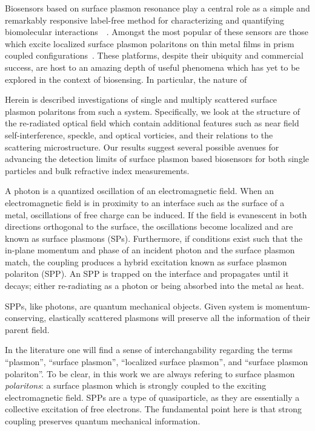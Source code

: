 Biosensors based on surface plasmon resonance play a central role as a
simple and remarkably responsive label-free method for characterizing and
quantifying biomolecular
interactions~\cite{homola1999surface}~\cite{homola2006surface}.  Amongst
the most popular of these sensors are those which excite localized surface
plasmon polaritons on thin metal films in prism coupled
configurations~\cite{hoa2007towards}.  These platforms, despite their
ubiquity and commercial success, are host to an amazing depth of useful
phenomena which has yet to be explored in the context of biosensing.  In
particular, the nature of 
\the\textwidth

Herein is described investigations of single and multiply scattered surface
plasmon polaritons from such a system.  Specifically, we look at the
structure of the re-radiated optical field which contain additional
features such as near field self-interference, speckle, and optical
vorticies, and their relations to the scattering microstructure.  Our
results suggest several possible avenues for advancing the detection limits
of surface plasmon based biosensors for both single particles and bulk
refractive index measurements.

A photon is a quantized oscillation of an electromagnetic field.  When an
electromagnetic  field is in proximity to an interface such as the surface
of a metal, oscillations of free charge can be induced.  If the field is
evanescent in both directions orthogonal to the surface, the oscillations
become localized and are known as surface plasmons (SPs).  Furthermore, if
conditions exist such that the in-plane momentum and phase of an incident
photon and the surface plasmon match, the coupling produces a hybrid
excitation known as surface plasmon polariton (SPP).  An SPP is trapped on
the interface and propagates until it decays; either re-radiating as a
photon or being absorbed into the metal as heat.

SPPs, like photons, are quantum mechanical objects.  Given system is
momentum-conserving, elastically scattered plasmons will preserve all the
information of their parent field.  

In the literature one will find a sense of interchangability regarding
the terms ``plasmon'', ``surface plasmon'', ``localized surface plasmon'',
and ``surface plasmon polariton''.  To be clear, in this work we are always
refering to surface plasmon \textit{polaritons}: a surface plasmon which is
strongly coupled to the exciting electromagnetic field.  SPPs are a type of
quasiparticle, as they are essentially a collective excitation of free
electrons.  The fundamental point here is that strong coupling preserves
quantum mechanical information.

